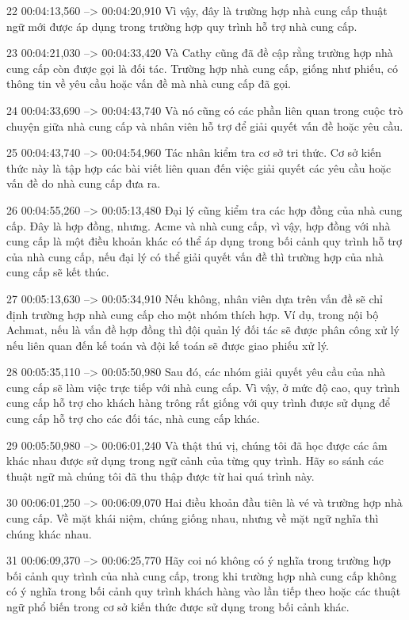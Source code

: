 22
00:04:13,560 --> 00:04:20,910
Vì vậy, đây là trường hợp nhà cung cấp thuật ngữ mới được áp dụng trong trường hợp quy trình hỗ trợ nhà cung cấp.

23
00:04:21,030 --> 00:04:33,420
Và Cathy cũng đã đề cập rằng trường hợp nhà cung cấp còn được gọi là đối tác.  Trường hợp nhà cung cấp, giống như phiếu, có thông tin về yêu cầu hoặc vấn đề mà nhà cung cấp đã gọi.

24
00:04:33,690 --> 00:04:43,740
Và nó cũng có các phần liên quan trong cuộc trò chuyện giữa nhà cung cấp và nhân viên hỗ trợ để giải quyết vấn đề hoặc yêu cầu.

25
00:04:43,740 --> 00:04:54,960
Tác nhân kiểm tra cơ sở tri thức.  Cơ sở kiến ​​thức này là tập hợp các bài viết liên quan đến việc giải quyết các yêu cầu hoặc vấn đề do nhà cung cấp đưa ra.

26
00:04:55,260 --> 00:05:13,480
Đại lý cũng kiểm tra các hợp đồng của nhà cung cấp.  Đây là hợp đồng, nhưng.  Acme và nhà cung cấp, vì vậy, hợp đồng với nhà cung cấp là một điều khoản khác có thể áp dụng trong bối cảnh quy trình hỗ trợ của nhà cung cấp, nếu đại lý có thể giải quyết vấn đề thì trường hợp của nhà cung cấp sẽ kết thúc.

27
00:05:13,630 --> 00:05:34,910
Nếu không, nhân viên dựa trên vấn đề sẽ chỉ định trường hợp nhà cung cấp cho một nhóm thích hợp.  Ví dụ, trong nội bộ Achmat, nếu là vấn đề hợp đồng thì đội quản lý đối tác sẽ được phân công xử lý nếu liên quan đến kế toán và đội kế toán sẽ được giao phiếu xử lý.

28
00:05:35,110 --> 00:05:50,980
Sau đó, các nhóm giải quyết yêu cầu của nhà cung cấp sẽ làm việc trực tiếp với nhà cung cấp.  Vì vậy, ở mức độ cao, quy trình cung cấp hỗ trợ cho khách hàng trông rất giống với quy trình được sử dụng để cung cấp hỗ trợ cho các đối tác, nhà cung cấp khác.

29
00:05:50,980 --> 00:06:01,240
Và thật thú vị, chúng tôi đã học được các âm khác nhau được sử dụng trong ngữ cảnh của từng quy trình.  Hãy so sánh các thuật ngữ mà chúng tôi đã thu thập được từ hai quá trình này.

30
00:06:01,250 --> 00:06:09,070
Hai điều khoản đầu tiên là vé và trường hợp nhà cung cấp.  Về mặt khái niệm, chúng giống nhau, nhưng về mặt ngữ nghĩa thì chúng khác nhau.

31
00:06:09,370 --> 00:06:25,770
Hãy coi nó không có ý nghĩa trong trường hợp bối cảnh quy trình của nhà cung cấp, trong khi trường hợp nhà cung cấp không có ý nghĩa trong bối cảnh quy trình khách hàng vào lần tiếp theo hoặc các thuật ngữ phổ biến trong cơ sở kiến ​​thức được sử dụng trong bối cảnh khác.

